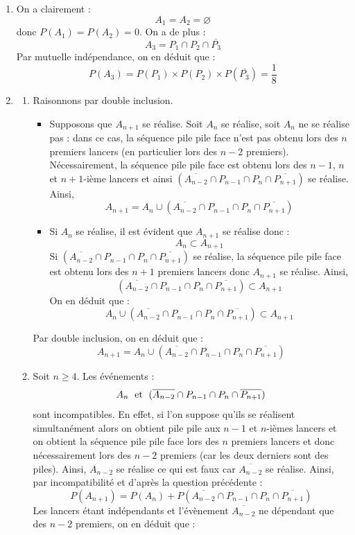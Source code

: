 \documentclass[a4paper,10pt]{report}
\begin{document}
\begin{enumerate}
\item On a clairement :
$$ A_1=A_2= \varnothing$$
donc $P(A_1)=P(A_2)=0$. On a de plus :
$$ A_3 = P_1 \cap P_2 \cap \overline{P_3}$$
Par mutuelle indépendance, on en déduit que :
$$ P(A_3) = P(P_1) \times P(P_2) \times P(\overline{P_3}) = \dfrac{1}{8}$$
\item 
\begin{enumerate}
\item Raisonnons par double inclusion.
\begin{itemize}
\item Supposons que $A_{n+1}$ se réalise. Soit $A_n$ se réalise, soit $A_n$ ne se réalise pas : dans ce cas, la séquence pile pile face n'est pas obtenu lors des $n$ premiers lancers (en particulier lors des $n-2$ premiers). Nécessairement, la séquence pile pile face est obtenu lors des $n-1$, $n$ et $n+1$-ième lancers et ainsi $(\overline{A_{n-2}} \cap P_{n-1} \cap P_n \cap \overline{P_{n+1}})$ se réalise. Ainsi,
$$ A_{n+1} = A_n  \cup (\overline{A_{n-2}} \cap P_{n-1} \cap P_n \cap \overline{P_{n+1}})$$
\item Si $A_n$ se réalise, il est évident que $A_{n+1}$ se réalise donc :
$$ A_n \subset A_{n+1}$$
Si $(\overline{A_{n-2}} \cap P_{n-1} \cap P_n \cap \overline{P_{n+1}})$ se réalise, la séquence pile pile face est obtenu lors des $n+1$ premiers lancers donc $A_{n+1}$ se réalise. Ainsi,
$$ (\overline{A_{n-2}} \cap P_{n-1} \cap P_n \cap \overline{P_{n+1}}) \subset A_{n+1}$$
On en déduit que :
$$ A_n \cup (\overline{A_{n-2}} \cap P_{n-1} \cap P_n \cap \overline{P_{n+1}})\subset A_{n+1}$$
\end{itemize}
Par double inclusion, on en déduit que :
$$A_{n+1} = A_n  \cup (\overline{A_{n-2}} \cap P_{n-1} \cap P_n \cap \overline{P_{n+1}})$$
\item Soit $n \geq 4$. Les événements :
$$  A_n  \; \hbox{ et } \;  (\overline{A_{n-2}} \cap P_{n-1} \cap P_n \cap \overline{P_{n+1}})$$
sont incompatibles. En effet, si l'on suppose qu'ils se réalisent simultanément alors on obtient pile pile aux $n-1$ et $n$-ièmes lancers et on obtient la séquence pile pile face lors des $n$ premiers lancers et donc nécessairement lors des $n-2$ premiers (car les deux derniers sont des piles). Ainsi, $A_{n-2}$ se réalise ce qui est faux car $\overline{A_{n-2}}$ se réalise. Ainsi, par incompatibilité et d'après la question précédente :
$$ P(A_{n+1}) = P(A_n) +   P(\overline{A_{n-2}} \cap P_{n-1} \cap P_n \cap \overline{P_{n+1}})$$
Les lancers étant indépendants et l'évènement $\overline{A_{n-2}}$ ne dépendant que des $n-2$ premiers, on en déduit que :

\end{enumerate}
\end{enumerate}
\end{document}
